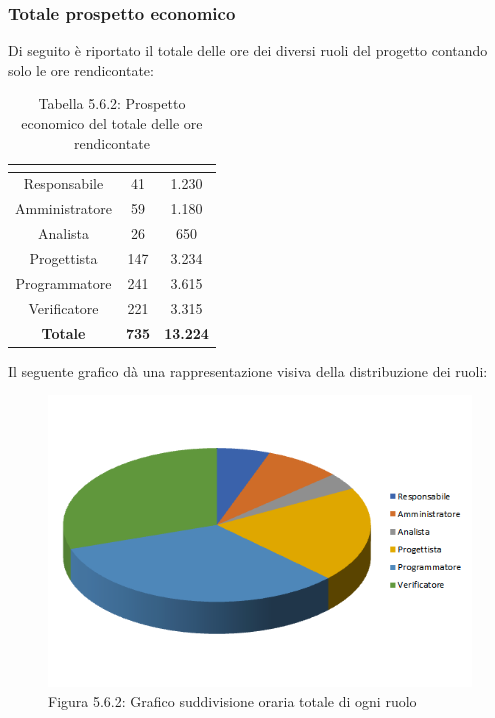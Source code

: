 \subsubsection{Totale prospetto economico}
Di seguito è riportato il totale delle ore dei diversi ruoli del progetto contando solo le ore rendicontate:

\renewcommand{\arraystretch}{1.5}
\begin{table}[H]
\begin{center}
\begin{tabular}{|c|c|c|}
\hline
\rowcolor{title_row}
\textbf{\color{title_text}{Ruolo}}  & \textbf{\color{title_text}{Ore}} & \textbf{\color{title_text}{Costo in \euro}} \\ \hline
Responsabile    & 41 & 1.230  \\ \hline
Amministratore  & 59 & 1.180 \\ \hline
Analista        & 26 & 650 \\ \hline
Progettista     & 147 & 3.234 \\ \hline
Programmatore   & 241 & 3.615 \\ \hline
Verificatore    & 221 & 3.315 \\ \hline
\textbf{Totale} & \textbf{735}    & \textbf{13.224}           \\ \hline
\end{tabular}
\caption{Tabella 5.6.2: Prospetto economico del totale delle ore rendicontate\label{}}
\end{center}
\end{table}
\renewcommand{\arraystretch}{1}

Il seguente grafico dà una rappresentazione visiva della distribuzione dei ruoli: \\
\begin{figure} [H]
	\centering
	\includegraphics[scale=1]{Res/ExcelGrafici/Grafici/TotaleRuoli.png}
	\caption{Figura 5.6.2: Grafico suddivisione oraria totale di ogni ruolo}\label{}
\end{figure}


\pagebreak
